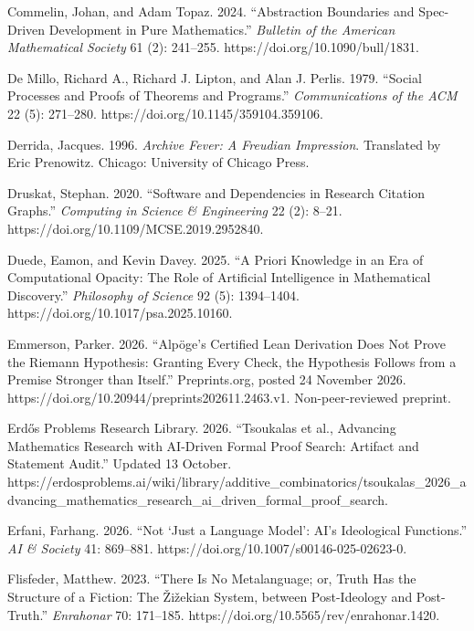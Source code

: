 \documentclass[sn-apa]{sn-jnl}
\begin{document}
\noindent\hangindent=0.5in Commelin, Johan, and Adam Topaz. 2024. “Abstraction Boundaries and Spec-Driven Development in Pure Mathematics.” \emph{Bulletin of the American Mathematical Society} 61 (2): 241–255. https://doi.org/10.1090/bull/1831.\par\medskip
\noindent\hangindent=0.5in De Millo, Richard A., Richard J. Lipton, and Alan J. Perlis. 1979. “Social Processes and Proofs of Theorems and Programs.” \emph{Communications of the ACM} 22 (5): 271–280. https://doi.org/10.1145/359104.359106.\par\medskip
\noindent\hangindent=0.5in Derrida, Jacques. 1996. \emph{Archive Fever: A Freudian Impression}. Translated by Eric Prenowitz. Chicago: University of Chicago Press.\par\medskip
\noindent\hangindent=0.5in Druskat, Stephan. 2020. “Software and Dependencies in Research Citation Graphs.” \emph{Computing in Science \& Engineering} 22 (2): 8–21. https://doi.org/10.1109/MCSE.2019.2952840.\par\medskip
\noindent\hangindent=0.5in Duede, Eamon, and Kevin Davey. 2025. “A Priori Knowledge in an Era of Computational Opacity: The Role of Artificial Intelligence in Mathematical Discovery.” \emph{Philosophy of Science} 92 (5): 1394–1404. https://doi.org/10.1017/psa.2025.10160.\par\medskip
\noindent\hangindent=0.5in Emmerson, Parker. 2026. “Alpöge’s Certified Lean Derivation Does Not Prove the Riemann Hypothesis: Granting Every Check, the Hypothesis Follows from a Premise Stronger than Itself.” Preprints.org, posted 24 November 2026. https://doi.org/10.20944/preprints202611.2463.v1. Non-peer-reviewed preprint.\par\medskip
\noindent\hangindent=0.5in Erdős Problems Research Library. 2026. “Tsoukalas et al., Advancing Mathematics Research with AI-Driven Formal Proof Search: Artifact and Statement Audit.” Updated 13 October. https://erdosproblems.ai/wiki/library/additive\_combinatorics/tsoukalas\_2026\_advancing\_mathematics\_research\_ai\_driven\_formal\_proof\_search.\par\medskip
\noindent\hangindent=0.5in Erfani, Farhang. 2026. “Not ‘Just a Language Model’: AI’s Ideological Functions.” \emph{AI \& Society} 41: 869–881. https://doi.org/10.1007/s00146-025-02623-0.\par\medskip
\noindent\hangindent=0.5in Flisfeder, Matthew. 2023. “There Is No Metalanguage; or, Truth Has the Structure of a Fiction: The Žižekian System, between Post-Ideology and Post-Truth.” \emph{Enrahonar} 70: 171–185. https://doi.org/10.5565/rev/enrahonar.1420.\par\medskip
\end{document}
